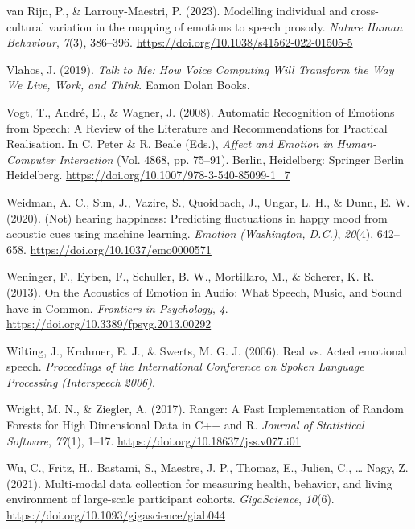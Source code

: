 \documentclass[
  english,
  man,floatsintext]{apa6}
\newlength{\cslhangindent}
\newenvironment{CSLReferences}[2] %
 {%
  \setlength{\parindent}{0pt}
  \ifodd #1 \everypar{\setlength{\hangindent}{\cslhangindent}}\ignorespaces\fi
  \ifnum #2 > 0
  \setlength{\parskip}{#2\baselineskip}
  \fi
 }%
 {}
\begin{document}
\begin{CSLReferences}{1}{0}
\leavevmode{}%
van Rijn, P., \& Larrouy-Maestri, P. (2023). Modelling individual and cross-cultural variation in the mapping of emotions to speech prosody. \emph{Nature Human Behaviour}, \emph{7}(3), 386--396. \url{https://doi.org/10.1038/s41562-022-01505-5}

\leavevmode{}%
Vlahos, J. (2019). \emph{Talk to {Me}: {How Voice Computing Will Transform} the {Way We Live}, {Work}, and {Think}}. Eamon Dolan Books.

\leavevmode{}%
Vogt, T., André, E., \& Wagner, J. (2008). Automatic {Recognition} of {Emotions} from {Speech}: {A Review} of the {Literature} and {Recommendations} for {Practical Realisation}. In C. Peter \& R. Beale (Eds.), \emph{Affect and {Emotion} in {Human-Computer Interaction}} (Vol. 4868, pp. 75--91). Berlin, Heidelberg: Springer Berlin Heidelberg. \url{https://doi.org/10.1007/978-3-540-85099-1_7}

\leavevmode{}%
Weidman, A. C., Sun, J., Vazire, S., Quoidbach, J., Ungar, L. H., \& Dunn, E. W. (2020). ({Not}) hearing happiness: {Predicting} fluctuations in happy mood from acoustic cues using machine learning. \emph{Emotion (Washington, D.C.)}, \emph{20}(4), 642--658. \url{https://doi.org/10.1037/emo0000571}

\leavevmode{}%
Weninger, F., Eyben, F., Schuller, B. W., Mortillaro, M., \& Scherer, K. R. (2013). On the {Acoustics} of {Emotion} in {Audio}: {What Speech}, {Music}, and {Sound} have in {Common}. \emph{Frontiers in Psychology}, \emph{4}. \url{https://doi.org/10.3389/fpsyg.2013.00292}

\leavevmode{}%
Wilting, J., Krahmer, E. J., \& Swerts, M. G. J. (2006). Real vs. Acted emotional speech. \emph{Proceedings of the International Conference on Spoken Language Processing (Interspeech 2006)}.

\leavevmode{}%
Wright, M. N., \& Ziegler, A. (2017). Ranger: {A Fast Implementation} of {Random Forests} for {High Dimensional Data} in {C}++ and {R}. \emph{Journal of Statistical Software}, \emph{77}(1), 1--17. \url{https://doi.org/10.18637/jss.v077.i01}

\leavevmode{}%
Wu, C., Fritz, H., Bastami, S., Maestre, J. P., Thomaz, E., Julien, C., \ldots{} Nagy, Z. (2021). Multi-modal data collection for measuring health, behavior, and living environment of large-scale participant cohorts. \emph{GigaScience}, \emph{10}(6). \url{https://doi.org/10.1093/gigascience/giab044}

\end{CSLReferences}
\end{document}
